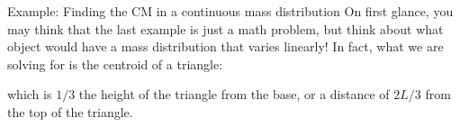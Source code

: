 \documentclass[12pt,compress,aspectratio=169]{beamer}
\begin{document}
\begin{frame}{Example: Finding the CM in a continuous mass distribution}
  On first glance, you may think that the last example is just a math problem,
  but think about what object would have a mass distribution that varies
  linearly! In fact, what we are solving for is the centroid of a triangle:
  \begin{center}
  \end{center}
  which is $1/3$ the height of the triangle from the base, or a distance of
  $2L/3$ from the top of the triangle.
\end{frame}



%
\end{document}
